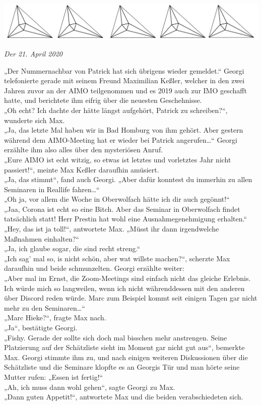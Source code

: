 \documentclass[oneside]{memoir}
\newcommand{\parasep}{
\bigskip
\bigskip
\begin{center} 
   \includegraphics[scale=.08]{parasep5.jpg} 
\end{center}
\bigskip
\bigskip
}
\begin{document}
\parasep

\textit{Der 21. April 2020}

\medskip
\noindent „Der Nummernachbar von Patrick hat sich übrigens wieder gemeldet.“ Georgi telefonierte gerade mit seinem Freund Maximilian Keßler, welcher in den zwei Jahren zuvor an der AIMO teilgenommen und es 2019 auch zur IMO geschafft hatte, und berichtete ihm eifrig über die neuesten Geschehnisse. \\
„Oh echt? Ich dachte der hätte längst aufgehört, Patrick zu schreiben?“, wunderte sich Max. \\
„Ja, das letzte Mal haben wir in Bad Homburg von ihm gehört. Aber gestern während dem AIMO-Meeting hat er wieder bei Patrick angerufen\ldots“ Georgi erzählte ihm also alles über den mysteriösen Anruf. \\
„Eure AIMO ist echt witzig, so etwas ist letztes und vorletztes Jahr nicht passiert!“, meinte Max Keßler daraufhin amüsiert. \\
„Ja, das stimmt“, fand auch Georgi. „Aber dafür konntest du immerhin zu allen Seminaren in Reallife fahren\ldots“ \\
„Oh ja, vor allem die Woche in Oberwolfach hätte ich dir auch gegönnt!“ \\
„Jaa, Corona ist echt so eine Bitch. Aber das Seminar in Oberwolfach findet tatsächlich statt! Herr Prestin hat wohl eine Ausnahmegenehmigung erhalten.“ \\
„Hey, das ist ja toll!“, antwortete Max. „Müsst ihr dann irgendwelche Maßnahmen einhalten?“ \\
„Ja, ich glaube sogar, die sind recht streng.“ \\
„Ich sag' mal so, is nicht schön, aber wat willste machen?“, scherzte Max daraufhin und beide schmunzelten. Georgi erzählte weiter: \\
„Aber mal im Ernst, die Zoom-Meetings sind einfach nicht das gleiche Erlebnis. Ich würde mich so langweilen, wenn ich nicht währenddessen mit den anderen über Discord reden würde. Marc zum Beispiel kommt seit einigen Tagen gar nicht mehr zu den Seminaren\ldots“ \\
„Marc Hieke?“, fragte Max nach. \\
„Ja“, bestätigte Georgi. \\
„Fishy. Gerade der sollte sich doch mal bisschen mehr anstrengen. Seine Platzierung auf der Schätzliste sieht im Moment gar nicht gut aus“, bemerkte Max. Georgi stimmte ihm zu, und nach einigen weiteren Diskussionen über die Schätzliste und die Seminare klopfte es an Georgis Tür und man hörte seine Mutter rufen: „Essen ist fertig!“ \\
„Ah, ich muss dann wohl gehen“, sagte Georgi zu Max. \\
„Dann guten Appetit!“, antwortete Max und die beiden verabschiedeten sich.
     
\end{document}
